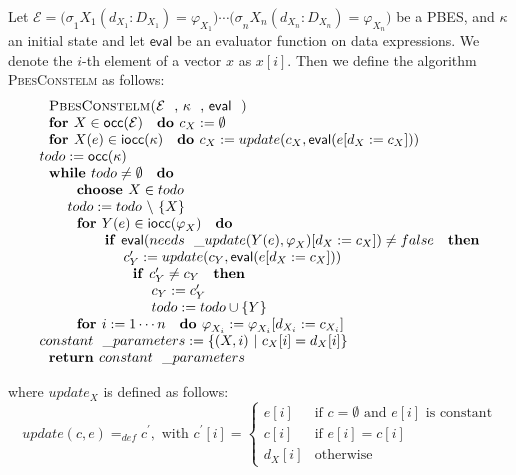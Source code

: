 \documentclass{article}
\begin{document}
Let $\mathcal{E=(\sigma }_{1}X_{1}(d_{X_{1}}:D_{X_{1}})=\varphi
_{X_{1}})\cdots \mathcal{(\sigma }_{n}X_{n}(d_{X_{n}}:D_{X_{n}})=\varphi
_{X_{n}})$ be a PBES, and $\kappa $ an initial state and let $\mathsf{eval}$
be an evaluator function on data expressions. We denote the $i$-th element
of a vector $x$ as $x[i]$. Then we define the algorithm \textsc{PbesConstelm}
as follows:$\qquad \qquad $%
\begin{equation*}
\begin{array}{l}
\text{\textsc{PbesConstelm(}}\mathcal{E}\text{, }\kappa \text{, }\mathsf{eval%
}\text{\textsc{)}} \\ 
\text{\textbf{for }}X\in \mathsf{occ}(\mathcal{E)}\text{ \textbf{do }}%
c_{X}:=\emptyset  \\ 
\text{\textbf{for }}X(e)\in \mathsf{iocc}(\kappa \mathcal{)}\text{ \textbf{%
do }}c_{X}:=update(c_{X},\mathsf{eval}(e[d_{X}:=c_{X}])) \\ 
todo:=\mathsf{occ}(\kappa \mathcal{)} \\ 
\text{\textbf{while }}todo\neq \emptyset \text{ \textbf{do}} \\ 
\qquad \text{\textbf{choose }}X\in todo \\ 
\qquad todo:=todo\ \backslash \ \{X\} \\ 
\qquad \text{\textbf{for }}Y(e)\in \mathsf{iocc}(\varphi _{X}\mathcal{)}%
\text{ \textbf{do}} \\ 
\qquad \qquad \text{\textbf{if }}\mathsf{eval}(needs\_update(Y(e),\varphi
_{X})[d_{X}:=c_{X}])\neq false\text{ \textbf{then}} \\ 
\qquad \qquad \qquad c_{Y}^{\prime }:=update(c_{Y},\mathsf{eval}%
(e[d_{X}:=c_{X}])) \\ 
\qquad \qquad \qquad \text{\textbf{if }}c_{Y}^{\prime }\neq c_{Y}\text{ 
\textbf{then}} \\ 
\qquad \qquad \qquad \qquad c_{Y}:=c_{Y}^{\prime } \\ 
\qquad \qquad \qquad \qquad todo:=todo\cup \{Y\} \\ 
\qquad \text{\textbf{for }}i:=1\cdots n\text{ \textbf{do }}\varphi
_{X_{i}}:=\varphi _{X_{i}}[d_{X_{i}}:=c_{X_{i}}] \\ 
constant\_parameters:=\{(X,i)\ |\ c_{X}[i]=d_{X}[i]\} \\ 
\text{\textbf{return }}constant\_parameters%
\end{array}%
\end{equation*}

where $update_{X}$ is defined as follows:%
\begin{equation*}
update(c,e)=_{def}c^{\prime },\text{ with }c^{\prime }[i]=\left\{ 
\begin{array}{ll}
e[i] & \text{if }c=\emptyset \text{ and }e[i]\text{ is constant} \\ 
c[i] & \text{if }e[i]=c[i] \\ 
d_{X}[i] & \text{otherwise}%
\end{array}%
\right. 
\end{equation*}
\end{document}
